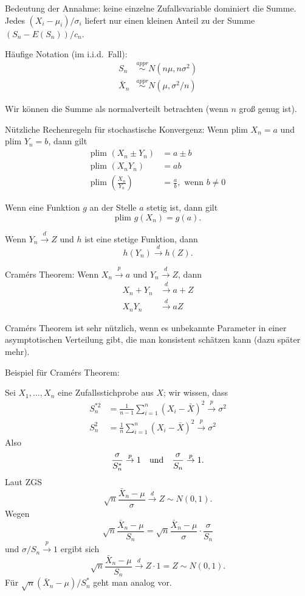 \documentclass{article}
\begin{document}
Bedeutung der Annahme: keine einzelne Zufallsvariable dominiert die Summe.
Jedes $(X_{i}-\mu _{i})/\sigma _{i}$ liefert nur einen kleinen Anteil
zu der Summe $(S_{n}-E(S_{n}))/c_{n}$.

Häufige Notation (im i.i.d.\ Fall):
\begin{align*}
S_{n}&\overset{appr}{\sim }N(n\mu ,n\sigma ^{2}) \\
\bar{X}_{n}&\overset{appr}{\sim }N(\mu ,\sigma ^{2}/n)
\end{align*}

Wir können die Summe als normalverteilt betrachten (wenn $n$ groß genug ist).

Nützliche Rechenregeln für stochastische Konvergenz:
Wenn $\textrm{plim }X_{n}=a$ und $\textrm{plim }Y_{n}=b$, dann gilt
\begin{align*}
\textrm{plim }(X_{n}\pm Y_{n}) &= a\pm b \\
\textrm{plim }(X_{n}Y_{n}) &= ab \\
\textrm{plim }\left( \frac{X_{n}}{Y_{n}}\right) &=\frac{a}{b},\textrm{ wenn }b\neq 0
\end{align*}

Wenn eine Funktion $g$ an der Stelle $a$ stetig ist, dann gilt
\[ \textrm{plim }g(X_n) =g(a). \]

Wenn $Y_{n}\overset{d}{\rightarrow }Z$ und $h$ ist eine stetige Funktion, dann
\[ h(Y_n) \overset{d}{\rightarrow }h(Z). \]

Cram\'{e}rs Theorem: Wenn $X_{n}\overset{p}{\rightarrow }a$ und 
$Y_{n}\overset{d}{\rightarrow }Z$, dann
\begin{align*}
X_{n}+Y_{n}&\overset{d}{\rightarrow }a+Z \\
X_{n}Y_{n}&\overset{d}{\rightarrow }aZ
\end{align*}

Cram\'{e}rs Theorem ist sehr nützlich, wenn es unbekannte Parameter in
einer asymptotischen Verteilung gibt, die man konsistent schätzen kann
(dazu später mehr).

Beispiel für Cram\'{e}rs Theorem:

Sei $X_{1},\ldots ,X_{n}$ eine Zufallsstichprobe aus $X$; wir wissen, dass
\begin{align*}
S_{n}^{\ast 2} &=\frac{1}{n-1}\sum_{i=1}^{n}\left( X_{i}-\bar{X}\right) ^{2}\overset{p}{\rightarrow }\sigma ^{2} \\
S_{n}^{2} &=\frac{1}{n}\sum_{i=1}^{n}\left( X_{i}-\bar{X}\right) ^{2}\overset{p}{\rightarrow }\sigma ^{2}
\end{align*}
Also 
\[ \frac{\sigma }{S_{n}^{\ast }}\overset{p}{\rightarrow }1\quad \text{und\quad }
\frac{\sigma }{S_{n}}\overset{p}{\rightarrow }1. \]
Laut ZGS
\[ \sqrt{n}\frac{\bar{X}_{n}-\mu }{\sigma }\overset{d}{\rightarrow }Z\sim N(0,1). \]
Wegen
\[ \sqrt{n}\frac{\bar{X}_{n}-\mu }{S_{n}}=\sqrt{n}\frac{\bar{X}_{n}-\mu }
{\sigma }\cdot \frac{\sigma }{S_{n}} \]
und $\sigma /S_{n}\overset{p}{\rightarrow }1$ ergibt sich
\[ \sqrt{n}\frac{\bar{X}_{n}-\mu }{S_{n}}\overset{d}{\rightarrow }Z\cdot
1=Z\sim N\left( 0,1\right). \]
Für $\sqrt{n}(\bar{X}_{n}-\mu )/S_{n}^{\ast }$ geht man analog vor.
\end{document}
